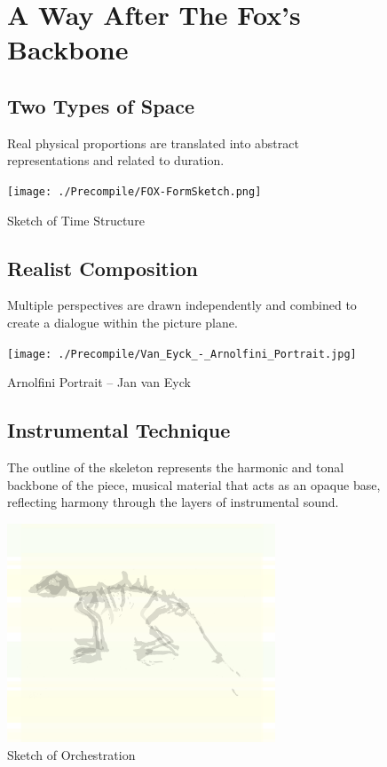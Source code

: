 
 \thispagestyle{empty}
\begin{figure}
\section{A Way After The Fox's Backbone}
\end{figure}
\begin{figure}
\subsection{Two Types of Space}
Real physical proportions are translated into abstract representations and related to duration. 
\begin{center}
 \texttt{[image: ./Precompile/FOX-FormSketch.png]}
\caption{Sketch of Time Structure}
\end{center}
\end{figure}
\hspace{10cm}
\begin{figure}
\subsection{Realist Composition}
Multiple perspectives are drawn independently and combined to create a dialogue within the picture plane. 
\begin{center}
 \texttt{[image: ./Precompile/Van\_Eyck\_-\_Arnolfini\_Portrait.jpg]}
\caption{Arnolfini Portrait -- Jan van Eyck}
\end{center}
\end{figure}
\pagebreak
\thispagestyle{empty} 
\begin{figure}
\subsection{Instrumental Technique}
The outline of the skeleton represents the harmonic and tonal backbone of the piece,
musical material that acts as an opaque base, reflecting harmony through the layers of instrumental sound. 

\begin{center}
 \includegraphics[width=8cm]{./Precompile/FOX6a.png}
\caption{Sketch of Orchestration}
\end{center}
\end{figure}

